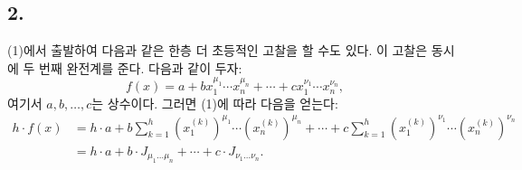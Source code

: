 
\subsection*{2.}
(1)에서 출발하여 다음과 같은 한층 더 초등적인 고찰을 할 수도 있다. 이 고찰은 동시에 두 번째 완전계를 준다. 다음과 같이 두자:
\[
  f(x)=a+b x_1^{\mu_1}\cdots x_n^{\mu_n}
       +\cdots+c x_1^{\nu_1}\cdots x_n^{\nu_n},
\]
여기서 $a,b,\ldots,c$는 상수이다. 그러면 (1)에 따라 다음을 얻는다:
\[
\begin{aligned}
 h\cdot f(x)
 &=h\cdot a+b\sum_{k=1}^{h}(x_1^{(k)})^{\mu_1}\cdots(x_n^{(k)})^{\mu_n}
     +\cdots
     +c\sum_{k=1}^{h}(x_1^{(k)})^{\nu_1}\cdots(x_n^{(k)})^{\nu_n} \\
 &=h\cdot a+b\cdot J_{\mu_1\ldots\mu_n}+\cdots+c\cdot J_{\nu_1\ldots\nu_n}.
\end{aligned}
\]
